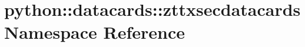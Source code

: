 \hypertarget{namespacepython_1_1datacards_1_1zttxsecdatacards}{
\section{python::datacards::zttxsecdatacards Namespace Reference}
\label{namespacepython_1_1datacards_1_1zttxsecdatacards}
}
